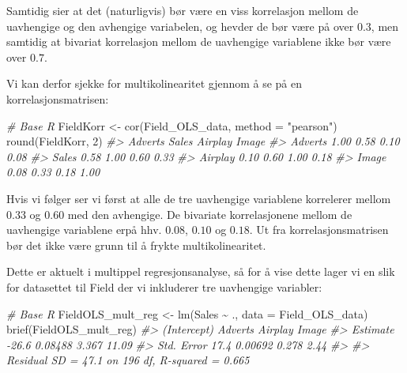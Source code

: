 \documentclass[
]{article}
\newenvironment{Shaded}{\begin{snugshade}}{\end{snugshade}}
\newcommand{\AttributeTok}[1]{\textcolor[rgb]{0.77,0.63,0.00}{#1}}
\newcommand{\CommentTok}[1]{\textcolor[rgb]{0.56,0.35,0.01}{\textit{#1}}}
\newcommand{\DecValTok}[1]{\textcolor[rgb]{0.00,0.00,0.81}{#1}}
\newcommand{\FunctionTok}[1]{\textcolor[rgb]{0.00,0.00,0.00}{#1}}
\newcommand{\NormalTok}[1]{#1}
\newcommand{\OtherTok}[1]{\textcolor[rgb]{0.56,0.35,0.01}{#1}}
\newcommand{\SpecialCharTok}[1]{\textcolor[rgb]{0.00,0.00,0.00}{#1}}
\newcommand{\StringTok}[1]{\textcolor[rgb]{0.31,0.60,0.02}{#1}}
\begin{document}
Samtidig sier \citet{pallantSPSSSurvivalManual2010} at det (naturligvis) bør være en viss korrelasjon mellom de uavhengige og den avhengige variabelen, og hevder de bør være på over \(0.3\), men samtidig at bivariat korrelasjon mellom de uavhengige variablene ikke bør være over \(0.7\).

Vi kan derfor sjekke for multikolinearitet gjennom å se på en korrelasjonsmatrisen:

\begin{Shaded}
\begin{Highlighting}[]
\CommentTok{\# Base R}
\NormalTok{FieldKorr }\OtherTok{\textless{}{-}} \FunctionTok{cor}\NormalTok{(Field\_OLS\_data, }\AttributeTok{method =} \StringTok{"pearson"}\NormalTok{)}
\FunctionTok{round}\NormalTok{(FieldKorr, }\DecValTok{2}\NormalTok{)}
\CommentTok{\#\textgreater{}         Adverts Sales Airplay Image}
\CommentTok{\#\textgreater{} Adverts    1.00  0.58    0.10  0.08}
\CommentTok{\#\textgreater{} Sales      0.58  1.00    0.60  0.33}
\CommentTok{\#\textgreater{} Airplay    0.10  0.60    1.00  0.18}
\CommentTok{\#\textgreater{} Image      0.08  0.33    0.18  1.00}
\end{Highlighting}
\end{Shaded}

Hvis vi følger \citet{pallantSPSSSurvivalManual2010} ser vi først at alle de tre uavhengige variablene korrelerer mellom \(0.33\) og \(0.60\) med den avhengige. De bivariate korrelasjonene mellom de uavhengige variablene erpå hhv. \(0.08\), \(0.10\) og \(0.18\). Ut fra korrelasjonsmatrisen bør det ikke være grunn til å frykte multikolinearitet.

Dette er aktuelt i multippel regresjonsanalyse, så for å vise dette lager vi en slik for datasettet til Field der vi inkluderer tre uavhengige variabler:

\begin{Shaded}
\begin{Highlighting}[]
\CommentTok{\# Base R}
\NormalTok{FieldOLS\_mult\_reg }\OtherTok{\textless{}{-}} \FunctionTok{lm}\NormalTok{(Sales }\SpecialCharTok{\textasciitilde{}}\NormalTok{ ., }\AttributeTok{data =}\NormalTok{ Field\_OLS\_data)}
\FunctionTok{brief}\NormalTok{(FieldOLS\_mult\_reg)}
\CommentTok{\#\textgreater{}            (Intercept) Adverts Airplay Image}
\CommentTok{\#\textgreater{} Estimate         {-}26.6 0.08488   3.367 11.09}
\CommentTok{\#\textgreater{} Std. Error        17.4 0.00692   0.278  2.44}
\CommentTok{\#\textgreater{} }
\CommentTok{\#\textgreater{}  Residual SD = 47.1 on 196 df, R{-}squared = 0.665}
\end{Highlighting}
\end{Shaded}
\end{document}
